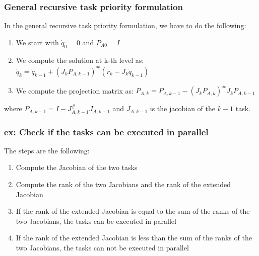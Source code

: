 \documentclass[a4paper,12pt]{article}
\begin{document}
\subsubsection{General recursive task priority formulation}
In the general recursive task priority formulation, we have to do the following:
\begin{enumerate}
    \item We start with $\dot{q}_0 = 0$ and $P_{A0}=I$
    \item We compute the solution at k-th level as: 
    $\dot{q}_k = \dot{q}_{k-1} + (J_k P_{A,k-1})^{\#}(\dot{r}_k - J_k \dot{q}_{k-1})$
    \item We compute the projection matrix as: $P_{A,k} = P_{A,k-1} - (J_kP_{A,k})^{\#} J_k P_{A,k-1}$
\end{enumerate}
where $P_{A,k-1} = I - J_{A,k-1}^{\#} J_{A,k-1}$ and $J_{A,k-1}$ is the jacobian of the $k-1$ task.
\subsubsection{ex: Check if the tasks can be executed in parallel}
The steps are the following:
\begin{enumerate}
    \item Compute the Jacobian of the two tasks
    \item Compute the rank of the two Jacobians and the rank of the extended Jacobian
    \item If the rank of the extended Jacobian is equal to the sum of the ranks of the two Jacobians,
        the tasks can be executed in parallel
    \item If the rank of the extended Jacobian is less than the sum of the ranks of the two Jacobians,
        the tasks can not be executed in parallel
\end{enumerate}
\end{document}
